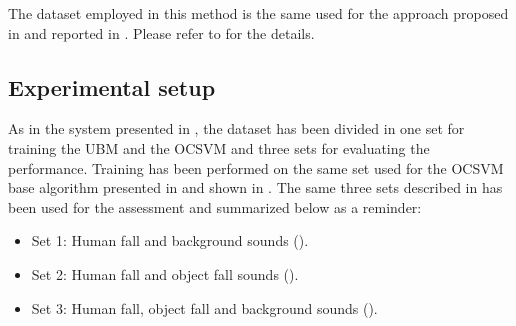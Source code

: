 The dataset employed in this method is the same used for the approach proposed in  and reported in . Please refer to  for the details.

\subsection{Experimental setup}
As in the system presented in , the dataset has been divided in one set for training the UBM and the OCSVM and three sets for evaluating the performance.
Training has been performed on the same set used for the OCSVM base algorithm presented in  and shown in . The same three sets described in  has been used for the assessment and summarized below as a reminder:
\begin{itemize}
	\item Set 1: Human fall and background sounds ().
	\item Set 2: Human fall and object fall sounds ().
	\item Set 3: Human fall, object fall and background sounds ().
\end{itemize}



